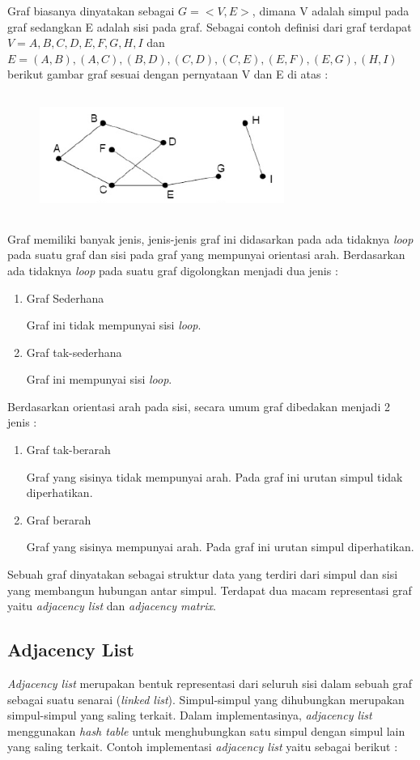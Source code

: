 Graf biasanya dinyatakan sebagai $G = <V,E>$, dimana V adalah simpul pada graf sedangkan E adalah sisi pada graf. Sebagai contoh definisi dari graf terdapat $V = {A,B,C,D,E,F,G,H,I}$ dan $E = {(A,B),(A,C),(B,D),(C,D),(C,E),(E,F),(E,G),(H,I)}$ berikut gambar graf sesuai dengan pernyataan V dan E di atas :

	\begin{figure} [H]
		\centering  
		\includegraphics[width=8cm, height=4cm]{graf5} 
		\label{fig:graf5} 
	\end{figure}
	
Graf memiliki banyak jenis, jenis-jenis graf ini didasarkan pada ada tidaknya \textit{loop} pada suatu graf dan sisi pada graf yang mempunyai orientasi arah. Berdasarkan ada tidaknya \textit{loop} pada suatu graf digolongkan menjadi dua jenis :
\begin{enumerate}
	\item Graf Sederhana
	
	Graf ini tidak mempunyai sisi \textit{loop}.
	\item Graf tak-sederhana
	
	Graf ini mempunyai sisi \textit{loop}.
\end{enumerate}

Berdasarkan orientasi arah pada sisi, secara umum graf dibedakan menjadi 2 jenis :
\begin{enumerate}
	\item Graf tak-berarah
	
	Graf yang sisinya tidak mempunyai arah. Pada graf ini urutan simpul tidak diperhatikan.
	\item Graf berarah
	
	Graf yang sisinya mempunyai arah. Pada graf ini urutan simpul diperhatikan. \cite{referensiCA5}
\end{enumerate}

Sebuah graf dinyatakan sebagai struktur data yang terdiri dari simpul dan sisi yang membangun hubungan antar simpul. Terdapat dua macam representasi graf yaitu \textit{adjacency list} dan \textit{adjacency matrix}. \cite{referensiGraph1}
\subsection{Adjacency List}
\textit{Adjacency list} merupakan bentuk representasi dari seluruh sisi dalam sebuah graf sebagai suatu senarai (\textit{linked list}). Simpul-simpul yang dihubungkan merupakan simpul-simpul yang saling terkait. Dalam implementasinya, \textit{adjacency list} menggunakan \textit{hash table} untuk menghubungkan satu simpul dengan simpul lain yang saling terkait. Contoh implementasi \textit{adjacency list} yaitu sebagai berikut :

